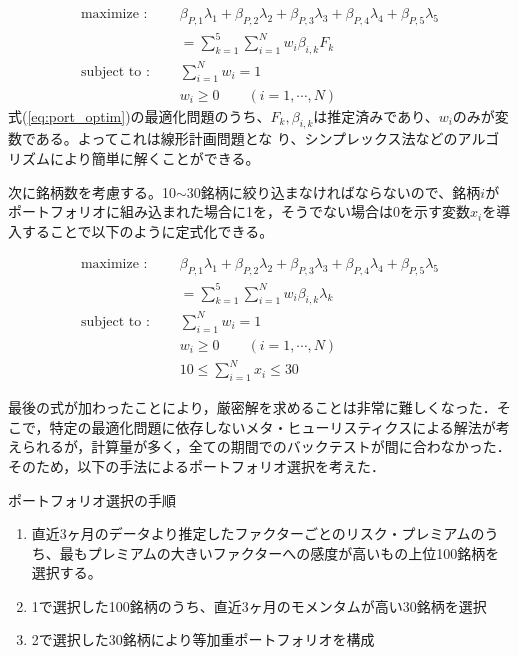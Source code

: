 \documentclass[11pt]{jreport}
\begin{document}
\begin{equation}
\begin{split}
\text{maximize : }\quad & \beta_{P,1}\lambda_1 + \beta_{P,2}\lambda_2 + \beta_{P,3}\lambda_3 + \beta_{P,4}\lambda_4 + \beta_{P,5}\lambda_5\\
& = \sum_{k=1}^5 \sum_{i=1}^N w_i \beta_{i,k} F_k\\
\text{subject to : }\quad & \sum_{i=1}^N w_i = 1\\
& w_i \geq 0\qquad(i=1,\cdots,N)
\end{split}
\label{eq:port_optim}
\end{equation}
式(\ref{eq:port_optim})の最適化問題のうち、$F_k, \beta_{i,k}$は推定済みであり、$w_i$のみが変数である。よってこれは線形計画問題とな
り、シンプレックス法などのアルゴリズムにより簡単に解くことができる。

次に銘柄数を考慮する。10$\sim$30銘柄に絞り込まなければならないので、銘柄$i$がポートフォリオに組み込まれた場合に1を，そうでない場合は0を示す変数$x_i$を導入することで以下のように定式化できる。

\begin{equation}
\begin{split}
\text{maximize : }\quad & \beta_{P,1}\lambda_1 + \beta_{P,2}\lambda_2 + \beta_{P,3}\lambda_3 + \beta_{P,4}\lambda_4 + \beta_{P,5}\lambda_5\\
& = \sum_{k=1}^5 \sum_{i=1}^N w_i \beta_{i,k} \lambda_k\\
\text{subject to : }\quad & \sum_{i=1}^N w_i = 1\\
& w_i \geq 0\qquad(i=1,\cdots,N)\\
&10 \leq \sum_{i=1}^Nx_i \leq 30
\end{split}
\label{eq:port_optim}
\end{equation}

最後の式が加わったことにより，厳密解を求めることは非常に難しくなった．そこで，特定の最適化問題に依存しないメタ・ヒューリスティクスによる解法が考えられるが，計算量が多く，全ての期間でのバックテストが間に合わなかった．そのため，以下の手法によるポートフォリオ選択を考えた．

\begin{itembox}[l]{ポートフォリオ選択の手順}
\begin{enumerate}
\item 直近3ヶ月のデータより推定したファクターごとのリスク・プレミアムのうち、最もプレミアムの大きいファクターへの感度が高いもの上位100銘柄を選択する。
\item 1で選択した100銘柄のうち、直近3ヶ月のモメンタムが高い30銘柄を選択
\item 2で選択した30銘柄により等加重ポートフォリオを構成
\end{enumerate}
\end{itembox}
\end{document}
